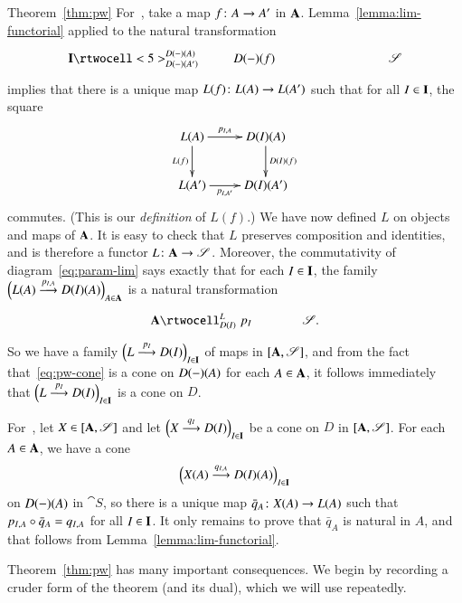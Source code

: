 \begin{pfof}{Theorem~\ref{thm:pw}}
For~, take a map $f\from A \to A'$ in $\mathbf{A}$.
Lemma~\ref{lemma:lim-functorial} applied
to the natural transformation
\[
\xymatrix@C+6em{
\scat{I} \rtwocell<5>^{D(\dashbk)(A)}_{D(\dashbk)(A')}%
{\hspace{2.5em}D(\dashbk)(f)}      &
\cat{S}
}
\]
implies that there is a unique map $L(f)\from L(A) \to L(A')$ such that for
all $I \in \mathbf{I}$, the square
% 
\begin{equation}
\label{eq:param-lim}
\begin{array}{c}
\xymatrix{
L(A) \ar[r]^-{p_{I, A}} \ar[d]_{L(f)}   &
D(I)(A) \ar[d]^{D(I)(f)}        \\
L(A') \ar[r]_-{p_{I, A'}}       &
D(I)(A')
}
\end{array}
\end{equation}
% 
commutes.  (This is our \emph{definition} of $L(f)$.)  We have now defined $L$
on objects and maps of $\mathbf{A}$.  It is easy to check that $L$ preserves
composition and identities, and is therefore a functor $L\from \scat{A}
\to \cat{S}$.  Moreover, the commutativity of diagram~\eqref{eq:param-lim}
says exactly that for each $I \in \mathbf{I}$, the family $\Bigl(L(A)
\stackrel{p_{I, A}}{\longrightarrow} D(I)(A)\Bigr)_{A \in \mathbf{A}}$ is a natural
transformation
\[
\xymatrix@C+1em{
\scat{A} \rtwocell^{L}_{D(I)}{\hspace{.3em}p_I} &\cat{S}.
}
\]
So we have a family $\Bigl(L \stackrel{p_I}{\longrightarrow} D(I)\Bigr)_{I \in \mathbf{I}}$ of
maps in $[\mathbf{A},\mathscr{S}]$, and from the fact
that~\eqref{eq:pw-cone} is a cone on $D(-)(A)$ for each $A \in
\mathbf{A}$, it follows immediately that $\Bigl(L \stackrel{p_I}{\longrightarrow} D(I)\Bigr)_{I
  \in \mathbf{I}}$ is a cone on $D$.

For~, let $X \in [\mathbf{A},\mathscr{S}]$ and let
$\Bigl(X \stackrel{q_I}{\longrightarrow} D(I)\Bigr)_{I \in \mathbf{I}}$ be a cone on $D$ in
$[\mathbf{A},\mathscr{S}]$.  For each $A \in \mathbf{A}$, we have a cone
\[
\Bigl(X(A) \stackrel{q_{I, A}}{\longrightarrow} D(I)(A)\Bigr)_{I \in \mathbf{I}}
\]
on
$D(-)(A)$ in $\cat{S}$, so there is a unique map $\bar{q}_A\from X(A)
\to L(A)$ such that $p_{I, A} \mathbin{\circ} \bar{q}_A = q_{I, A}$ for all $I \in
\mathbf{I}$.  It only remains to prove that $\bar{q}_A$ is natural in $A$, and
that follows from
Lemma~\ref{lemma:lim-functorial}.  
\end{pfof}

Theorem~\ref{thm:pw} has many important consequences.  We begin by recording
a cruder form of the theorem (and its dual), which we will use repeatedly.


